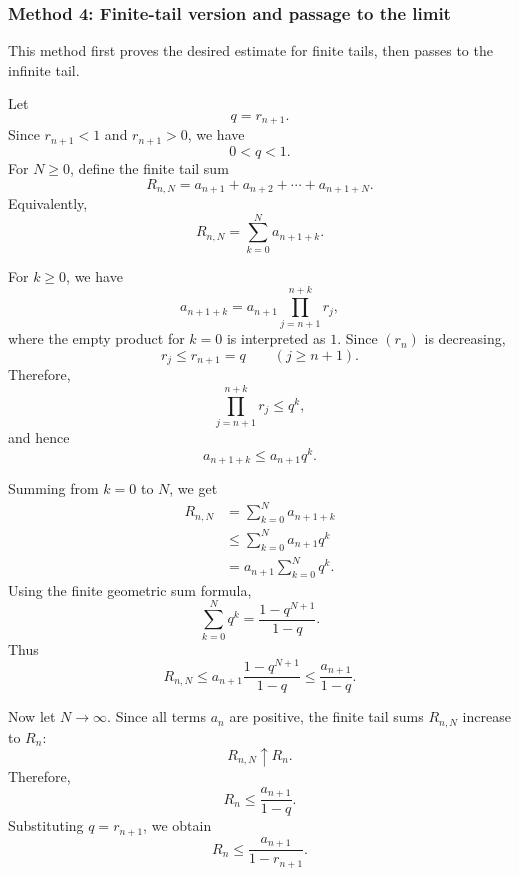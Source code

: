 \documentclass[12pt]{article}
\begin{document}
\newpage
\subsubsection*{Method 4: Finite-tail version and passage to the limit}

This method first proves the desired estimate for finite tails, then passes to the infinite tail.

Let
\[
q=r_{n+1}.
\]
Since \(r_{n+1}<1\) and \(r_{n+1}>0\), we have
\[
0<q<1.
\]
For \(N\ge 0\), define the finite tail sum
\[
R_{n,N}=a_{n+1}+a_{n+2}+\cdots+a_{n+1+N}.
\]
Equivalently,
\[
R_{n,N}=\sum_{k=0}^{N}a_{n+1+k}.
\]

For \(k\ge 0\), we have
\[
a_{n+1+k}
=
a_{n+1}\prod_{j=n+1}^{n+k}r_j,
\]
where the empty product for \(k=0\) is interpreted as \(1\). Since \((r_n)\) is decreasing,
\[
r_j\le r_{n+1}=q
\qquad(j\ge n+1).
\]
Therefore,
\[
\prod_{j=n+1}^{n+k}r_j\le q^k,
\]
and hence
\[
a_{n+1+k}\le a_{n+1}q^k.
\]

Summing from \(k=0\) to \(N\), we get
\begin{align*}
R_{n,N}
&=
\sum_{k=0}^{N}a_{n+1+k}\\
&\le
\sum_{k=0}^{N}a_{n+1}q^k\\
&=
a_{n+1}\sum_{k=0}^{N}q^k.
\end{align*}
Using the finite geometric sum formula,
\[
\sum_{k=0}^{N}q^k
=
\frac{1-q^{N+1}}{1-q}.
\]
Thus
\[
R_{n,N}
\le
a_{n+1}\frac{1-q^{N+1}}{1-q}
\le
\frac{a_{n+1}}{1-q}.
\]

Now let \(N\to\infty\). Since all terms \(a_n\) are positive, the finite tail sums \(R_{n,N}\) increase to \(R_n\):
\[
R_{n,N}\uparrow R_n.
\]
Therefore,
\[
R_n\le \frac{a_{n+1}}{1-q}.
\]
Substituting \(q=r_{n+1}\), we obtain
\[
\boxed{
R_n\le \frac{a_{n+1}}{1-r_{n+1}}.
}
\]
\end{document}
